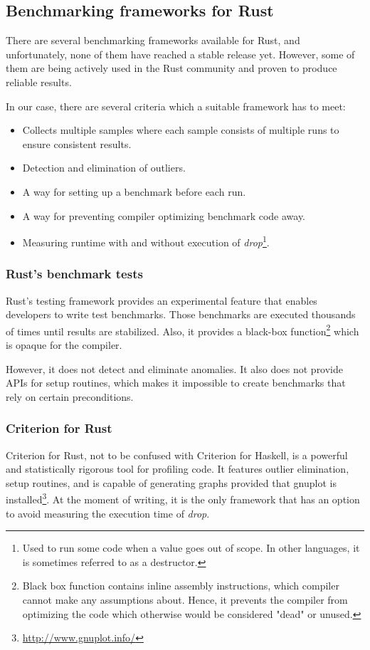 \subsection{Benchmarking frameworks for Rust}
There are several benchmarking frameworks available for Rust, and unfortunately, none of them have reached a stable release yet. However, some of them are being actively used in the Rust community and proven to produce reliable results.  

In our case, there are several criteria which a suitable framework has to meet:
\begin{itemize}
    \item Collects multiple samples where each sample consists of multiple runs to ensure consistent results. 
    \item Detection and elimination of outliers.     
    \item A way for setting up a benchmark before each run. 
    \item A way for preventing compiler optimizing benchmark code away.     
    \item Measuring runtime with and without execution of \emph{drop}\footnote{Used to run some code when a value goes out of scope. In other languages, it is sometimes referred to as a destructor.}.
\end{itemize}

\subsubsection*{Rust's benchmark tests}
Rust's testing framework provides an experimental feature that enables developers to write test benchmarks. Those benchmarks are executed thousands of times until results are stabilized. Also, it provides a black-box function\footnote{Black box function contains inline assembly instructions, which compiler cannot make any assumptions about. Hence, it prevents the compiler from optimizing the code which otherwise would be considered "dead" or unused.} which is opaque for the compiler. 

However, it does not detect and eliminate anomalies. It also does not provide APIs for setup routines, which makes it impossible to create benchmarks that rely on certain preconditions.

\subsubsection*{Criterion for Rust}
Criterion for Rust, not to be confused with Criterion for Haskell, is a powerful and statistically rigorous tool for profiling code. It features outlier elimination, setup routines, and is capable of generating graphs provided that gnuplot is installed\footnote{\url{http://www.gnuplot.info/}}. At the moment of writing, it is the only framework that has an option to avoid measuring the execution time of \emph{drop}. 

